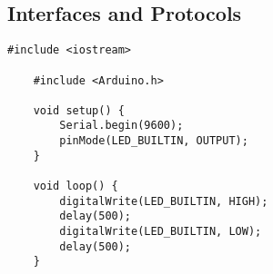 \subsection{Interfaces and Protocols}\label{04Sub: InterfacesAndProtocols}




\begin{lstlisting}[language=Arduino]
    #include <iostream>

    #include <Arduino.h>

    void setup() {
        Serial.begin(9600);
        pinMode(LED_BUILTIN, OUTPUT);
    }
    
    void loop() {
        digitalWrite(LED_BUILTIN, HIGH);
        delay(500);
        digitalWrite(LED_BUILTIN, LOW);
        delay(500);
    }
    \end{lstlisting}







